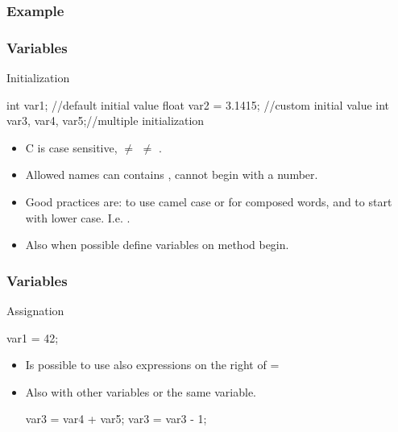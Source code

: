 \begin{frame}[fragile]
  \frametitle{Example}
\end{frame}

\begin{frame}[fragile]
  \frametitle{Variables}
  \begin{block}{Initialization}
    \begin{cblock}
int var1;            //default initial value
float var2 = 3.1415; //custom initial value
int var3, var4, var5;//multiple initialization
    \end{cblock}
  \end{block}
  \begin{itemize}
  \item C is \alert{case sensitive},  $\neq$  $\neq$ .
  \item Allowed names can contains \cc{[A-Z,a-z,0-9,_]}, cannot begin
    with a number.
  \item Good practices are: to use \alert{camel case} or \cc{_} for composed
    words, and to start with
    \alert{lower case}. I.e. .
  \item Also when possible define variables on method begin.
  \end{itemize}
\end{frame}

\begin{frame}[fragile]
  \frametitle{Variables}
    \begin{block}{Assignation}
    \begin{cblock}
var1 = 42;
    \end{cblock}
    \begin{itemize}
    \item Is possible to use also \alert{expressions} on the right of
      =
    \item Also with other variables or the same variable.
      \begin{cblock}
var3 = var4 + var5;
var3 = var3 - 1;
      \end{cblock}
    \end{itemize}
  \end{block}
\end{frame}

